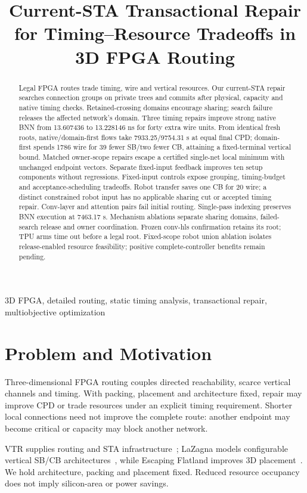 \documentclass[conference,10pt]{IEEEtran}
\title{Current-STA Transactional Repair for Timing--Resource Tradeoffs in 3D FPGA Routing}
\author{\IEEEauthorblockN{Anonymous development manuscript}}
\begin{document}
\maketitle
\begin{abstract}
Legal FPGA routes trade timing, wire and vertical resources. Our current-STA repair searches connection groups on private trees and commits after physical, capacity and native timing checks. Retained-crossing domains encourage sharing; search failure releases the affected network's domain. Three timing repairs improve strong native BNN from 13.607436 to 13.228146 ns for forty extra wire units. From identical fresh roots, native/domain-first flows take 7933.25/9754.31 s at equal final CPD; domain-first spends 1786 wire for 39 fewer SB/two fewer CB, attaining a fixed-terminal vertical bound. Matched owner-scope repairs escape a certified single-net local minimum with unchanged endpoint vectors. Separate fixed-input feedback improves ten setup components without regressions. Fixed-input controls expose grouping, timing-budget and acceptance-scheduling tradeoffs. Robot transfer saves one CB for 20 wire; a distinct constrained robot input has no applicable sharing cut or accepted timing repair. Conv-layer and attention pairs fail initial routing. Single-pass indexing preserves BNN execution at 7463.17 s. Mechanism ablations separate sharing domains, failed-search release and owner coordination. Frozen conv-hls confirmation retains its root; TPU arms time out before a legal root. Fixed-scope robot union ablation isolates release-enabled resource feasibility; positive complete-controller benefits remain pending.
\end{abstract}
\begin{IEEEkeywords}
3D FPGA, detailed routing, static timing analysis, transactional repair, multiobjective optimization
\end{IEEEkeywords}

\section{Problem and Motivation}
Three-dimensional FPGA routing couples directed reachability, scarce vertical channels and timing. With packing, placement and architecture fixed, repair may improve CPD or trade resources under an explicit timing requirement. Shorter local connections need not improve the complete route: another endpoint may become critical or capacity may block another network.

VTR supplies routing and STA infrastructure~\cite{vtr9paper}; LaZagna models configurable vertical SB/CB architectures~\cite{lazagna}, while Escaping Flatland improves 3D placement~\cite{flatland}. We hold architecture, packing and placement fixed. Reduced resource occupancy does not imply silicon-area or power savings.
\end{document}
